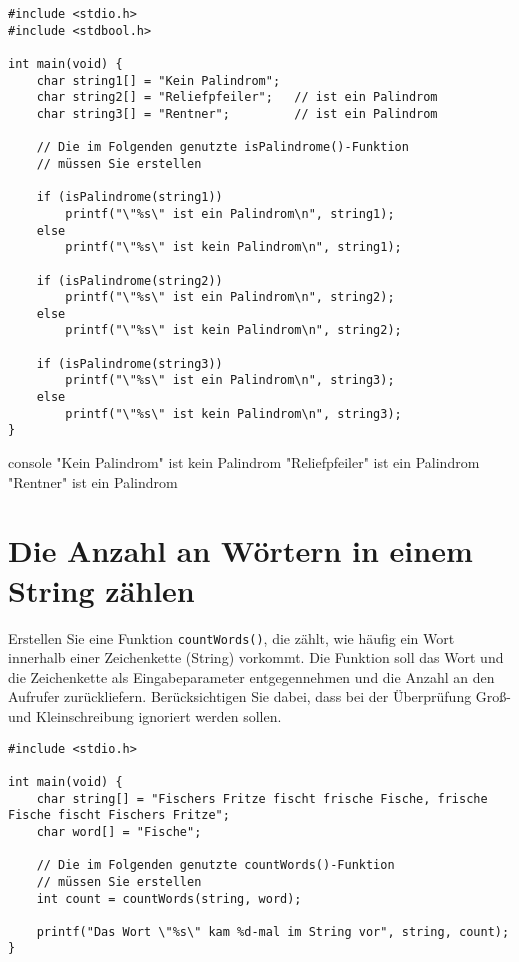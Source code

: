 \Vorlage
\begin{verbatim}
#include <stdio.h>
#include <stdbool.h>

int main(void) {
    char string1[] = "Kein Palindrom";
    char string2[] = "Reliefpfeiler";   // ist ein Palindrom
    char string3[] = "Rentner";         // ist ein Palindrom

    // Die im Folgenden genutzte isPalindrome()-Funktion
    // müssen Sie erstellen

    if (isPalindrome(string1))
        printf("\"%s\" ist ein Palindrom\n", string1);
    else
        printf("\"%s\" ist kein Palindrom\n", string1);

    if (isPalindrome(string2))
        printf("\"%s\" ist ein Palindrom\n", string2);
    else
        printf("\"%s\" ist kein Palindrom\n", string2);

    if (isPalindrome(string3))
        printf("\"%s\" ist ein Palindrom\n", string3);
    else
        printf("\"%s\" ist kein Palindrom\n", string3);
}
\end{verbatim}

\begin{mybox}[Bildschirmausgabe]{console}
    "Kein Palindrom" ist kein Palindrom
    "Reliefpfeiler" ist ein Palindrom
    "Rentner" ist ein Palindrom
\end{mybox}




\chapter{Die Anzahl an Wörtern in einem String zählen}

\vspace{10pt}

Erstellen Sie eine Funktion \texttt{countWords()}, die zählt, wie häufig
ein Wort innerhalb einer Zeichenkette (String) vorkommt. Die Funktion soll das
Wort und die Zeichenkette als Eingabeparameter entgegennehmen und die Anzahl an
den Aufrufer zurückliefern. Berücksichtigen Sie dabei, dass bei der Überprüfung
Groß- und Kleinschreibung ignoriert werden sollen.

\Vorlage
\begin{verbatim}
#include <stdio.h>

int main(void) {
    char string[] = "Fischers Fritze fischt frische Fische, frische Fische fischt Fischers Fritze";
    char word[] = "Fische";

    // Die im Folgenden genutzte countWords()-Funktion
    // müssen Sie erstellen
    int count = countWords(string, word);

    printf("Das Wort \"%s\" kam %d-mal im String vor", string, count);
}
\end{verbatim}

